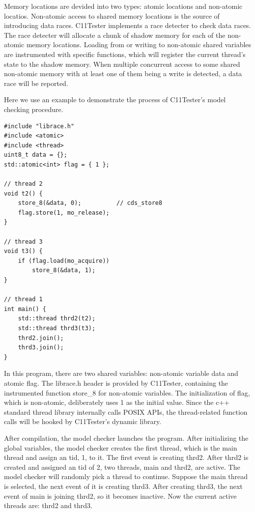 Memory locations are devided into two types: atomic locations and non-atomic locatios. Non-atomic access to shared memory locations is the source of introducing data races. C11Tester implements a race detecter to check data races. The race detecter will allocate a chunk of shadow memory for each of the non-atomic memory locations. Loading from or writing to non-atomic shared variables are instrumented with specific functions, which will register the current thread's state to the shadow memory. When multiple concurrent access to some shared non-atomic memory with at least one of them being a write is detected, a data race will be reported.

Here we use an example to demonstrate the process of C11Tester's model checking procedure.

\begin{lstlisting}[caption={P3}, label={P3}]
#include "librace.h"
#include <atomic>
#include <thread>
uint8_t data = {};
std::atomic<int> flag = { 1 };  

// thread 2
void t2() {
    store_8(&data, 0);          // cds_store8    
    flag.store(1, mo_release); 
}

// thread 3
void t3() {
    if (flag.load(mo_acquire))
        store_8(&data, 1);
}

// thread 1
int main() {
    std::thread thrd2(t2);
    std::thread thrd3(t3);
    thrd2.join();
    thrd3.join();
}
\end{lstlisting}

In this program, there are two shared variables: non-atomic variable data and atomic flag. The librace.h header is provided by C11Tester, containing the instrumented function store\_8 for non-atomic variables. The initialization of flag, which is non-atomic, deliberately uses 1 as the initial value. Since the c++ standard thread library internally calls POSIX APIs, the thread-related function calls will be hooked by C11Tester's dynamic library.

After compilation, the model checker launches the program. After initializing the global variables, the model checker creates the first thread, which is the main thread and assign an tid, 1, to it. The first event is creating thrd2. After thrd2 is created and assigned an tid of 2, two threads, main and thrd2, are active. The model checker will randomly pick a thread to continue. Suppose the main thread is selected, the next event of it is creating thrd3. After creating thrd3, the next event of main is joining thrd2, so it becomes inactive. Now the current active threads are: thrd2 and thrd3.

